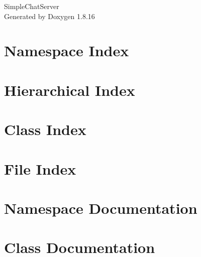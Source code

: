 \let\mypdfximage\pdfximage\def\pdfximage{\immediate\mypdfximage}\documentclass[twoside]{book}
\newcommand{\+}{\discretionary{\mbox{\scriptsize$\hookleftarrow$}}{}{}}
\newcommand{\clearemptydoublepage}{%
  \newpage{\pagestyle{empty}\cleardoublepage}%
}
\begin{document}
\hypersetup{pageanchor=false,
             bookmarksnumbered=true,
             pdfencoding=unicode
            }
\begin{titlepage}
\vspace*{7cm}
\begin{center}%
{\Large Simple\+Chat\+Server }\\
\vspace*{1cm}
{\large Generated by Doxygen 1.8.16}\\
\end{center}
\end{titlepage}
\clearemptydoublepage
{}
\tableofcontents
\clearemptydoublepage
{}
\hypersetup{pageanchor=true}

\chapter{Namespace Index}

\chapter{Hierarchical Index}

\chapter{Class Index}

\chapter{File Index}

\chapter{Namespace Documentation}



\chapter{Class Documentation}
























\end{document}
